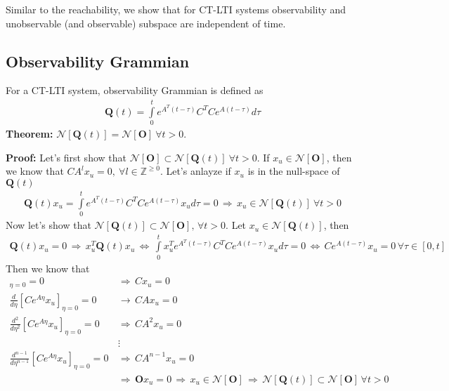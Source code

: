 \documentclass[twoside]{article}
\begin{document}
%
Similar to the reachability, we show that for CT-LTI systems
observability and unobservable (and observable) subspace
are independent of time. 

\subsection{Observability Grammian}

For a CT-LTI system, observability Grammian is defined as
%
\begin{align*}
    \textbf{Q}(t) = \int\limits_{0}^{t} e^{A^T (t - \tau)} C^T C e^{A (t - \tau)}  d \tau 
\end{align*}
%
\textbf{Theorem:} $\mathcal{N}[ \textbf{Q}(t) ] = \mathcal{N}[ \mathbf{O} ] \ \forall t > 0$. 

\textbf{Proof:} Let's first show that $\mathcal{N}[ \mathbf{O} ] \subset \mathcal{N}[ \textbf{Q}(t) ] \ \forall t > 0$. 
If $x_u \in \mathcal{N}[ \mathbf{O} ]$, then we know that $C A^{l} x_u = 0, \ \forall l \in \mathbb{Z}^{\geq 0}$. Let's anlayze 
if $x_u$ is in the null-space of $\textbf{Q}(t)$
%
\begin{align*}
    \textbf{Q}(t) x_u = \int\limits_{0}^{t} e^{A^T (t - \tau)} C^T C e^{A (t - \tau)} x_u d \tau
    = 0 \, \Rightarrow \, x_u \in \mathcal{N}[ \textbf{Q}(t) ] \ \forall t > 0
\end{align*}
%
Now let's show that $\mathcal{N}[ \textbf{Q}(t) ] \subset \mathcal{N}[ \mathbf{O} ], \, \forall t > 0$.
Let $x_u \in \mathcal{N}[ \textbf{Q}(t) ]$, then
\begin{align*}
    \textbf{Q}(t) x_u = 0 \, \Rightarrow \, x_u^T \textbf{Q}(t) x_u \, \iff \, \int\limits_{0}^{t} x_u^T e^{A^T (t - \tau)} C^T C e^{A (t - \tau)} x_u d \tau
    = 0 \, \iff \, C e^{A (t - \tau)} x_u = 0 \, \forall \tau \in [0 , t]
\end{align*}
%
Then we know that 
%
\begin{align*}
  [ C e^{A \eta} x_u]_{\eta = 0} = 0 \, &\Rightarrow \, C x_u = 0
  \\
  \frac{d}{d\eta}[ C e^{A \eta} x_u ]_{\eta = 0} = 0 \, &\rightarrow \, C A x_u = 0
  \\
  \frac{d^2}{d\eta^2}[ C e^{A \eta} x_u ]_{\eta = 0} = 0 \, &\Rightarrow \, C A^2 x_u = 0
  \\
  &\vdots
    \\
    \frac{d^{n-1}}{d\eta^{n-1}}[ C e^{A \eta} x_u ]_{\eta = 0} = 0 \, &\Rightarrow \, C A^{n-1} x_u = 0
    \\
    &\Rightarrow \, \mathbf{O} x_u = 0 \, \Rightarrow \, x_u \in \mathcal{N}[ \mathbf{O} ]
    \, \Rightarrow \, \mathcal{N}[ \textbf{Q}(t) ] \subset \mathcal{N}[ \mathbf{O} ] \, \forall t > 0
\end{align*}
\end{document}
